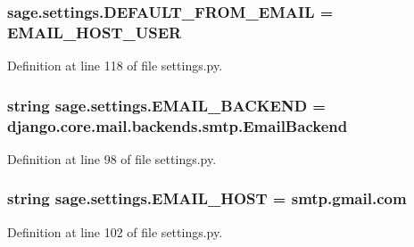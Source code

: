 \subsubsection[{D\+E\+F\+A\+U\+L\+T\+\_\+\+F\+R\+O\+M\+\_\+\+E\+M\+A\+I\+L}]{\setlength{\rightskip}{0pt plus 5cm}sage.\+settings.\+D\+E\+F\+A\+U\+L\+T\+\_\+\+F\+R\+O\+M\+\_\+\+E\+M\+A\+I\+L = {\bf E\+M\+A\+I\+L\+\_\+\+H\+O\+S\+T\+\_\+\+U\+S\+E\+R}}\label{namespacesage_1_1settings_a6517c4f93850d63e2bdbe7040ad0e2ff}


Definition at line 118 of file settings.\+py.

\hypertarget{namespacesage_1_1settings_a2d83ca0a279480aa03599465a0386b17}{}
\subsubsection[{E\+M\+A\+I\+L\+\_\+\+B\+A\+C\+K\+E\+N\+D}]{\setlength{\rightskip}{0pt plus 5cm}string sage.\+settings.\+E\+M\+A\+I\+L\+\_\+\+B\+A\+C\+K\+E\+N\+D = \textquotesingle{}django.\+core.\+mail.\+backends.\+smtp.\+Email\+Backend\textquotesingle{}}\label{namespacesage_1_1settings_a2d83ca0a279480aa03599465a0386b17}


Definition at line 98 of file settings.\+py.

\hypertarget{namespacesage_1_1settings_a594329fe15c9680f523afaab779411ed}{}
\subsubsection[{E\+M\+A\+I\+L\+\_\+\+H\+O\+S\+T}]{\setlength{\rightskip}{0pt plus 5cm}string sage.\+settings.\+E\+M\+A\+I\+L\+\_\+\+H\+O\+S\+T = \textquotesingle{}smtp.\+gmail.\+com\textquotesingle{}}\label{namespacesage_1_1settings_a594329fe15c9680f523afaab779411ed}


Definition at line 102 of file settings.\+py.

\hypertarget{namespacesage_1_1settings_a66e7a16ed6b0df5716a6579fcba949a6}{}
